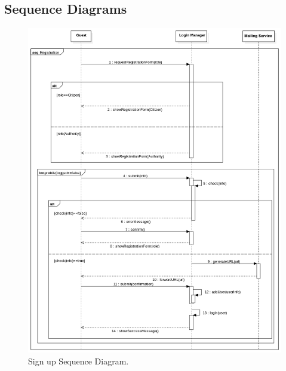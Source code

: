 \documentclass{report}
\begin{document}
\subsection{Sequence Diagrams}
\begin{figure}[ht!]
	\begin{center}
	\includegraphics[width=\textwidth]{./img/RegistrationSD.png}
	\end{center}
	\caption{Sign up Sequence Diagram.}
	\label{fig:SequenceDiagram1}
	\end{figure}
\newpage
\end{document}
